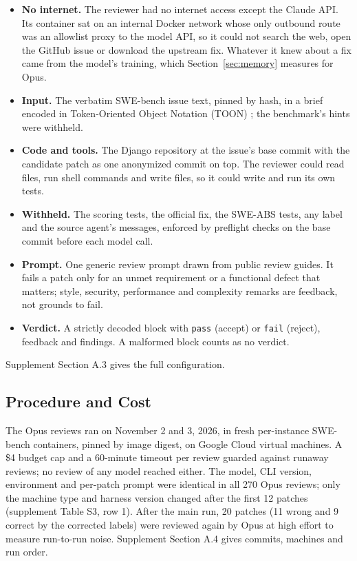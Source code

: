 \documentclass[sigconf,nonacm]{acmart}
\newcommand{\code}[1]{\texttt{#1}}
\begin{document}
\begin{itemize}
\item \textbf{No internet.} The reviewer had no internet access except the Claude API. Its container sat on an internal Docker network whose only outbound route was an allowlist proxy to the model API, so it could not search the web, open the GitHub issue or download the upstream fix. Whatever it knew about a fix came from the model's training, which Section~\ref{sec:memory} measures for Opus.
\item \textbf{Input.} The verbatim SWE-bench issue text, pinned by hash, in a brief encoded in Token-Oriented Object Notation (TOON) \cite{toon}; the benchmark's hints were withheld.
\item \textbf{Code and tools.} The Django repository at the issue's base commit with the candidate patch as one anonymized commit on top. The reviewer could read files, run shell commands and write files, so it could write and run its own tests.
\item \textbf{Withheld.} The scoring tests, the official fix, the SWE-ABS tests, any label and the source agent's messages, enforced by preflight checks on the base commit before each model call.
\item \textbf{Prompt.} One generic review prompt drawn from public review guides. It fails a patch only for an unmet requirement or a functional defect that matters; style, security, performance and complexity remarks are feedback, not grounds to fail.
\item \textbf{Verdict.} A strictly decoded block with \code{pass} (accept) or \code{fail} (reject), feedback and findings. A malformed block counts as no verdict.
\end{itemize}

Supplement Section A.3 gives the full configuration.

\subsection{Procedure and Cost}\label{sec:procedure}

The Opus reviews ran on November 2 and 3, 2026, in fresh per-instance SWE-bench containers, pinned by image digest, on Google Cloud virtual machines. A \$4 budget cap and a 60-minute timeout per review guarded against runaway reviews; no review of any model reached either. The model, CLI version, environment and per-patch prompt were identical in all 270 Opus reviews; only the machine type and harness version changed after the first 12 patches (supplement Table S3, row 1). After the main run, 20 patches (11 wrong and 9 correct by the corrected labels) were reviewed again by Opus at high effort to measure run-to-run noise. Supplement Section A.4 gives commits, machines and run order.
\end{document}
